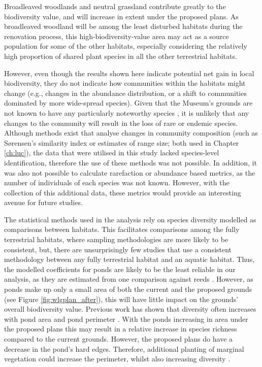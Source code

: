 Broadleaved woodlands and neutral grassland contribute greatly to the biodiversity value, and will increase in extent under the proposed plans. As broadleaved woodland will be among the least disturbed habitats during the renovation process, this high-biodiversity-value area may act as a source population for some of the other habitats, especially considering the relatively high proportion of shared plant species in all the other terrestrial habitats.


However, even though the results shown here indicate potential net gain in local biodiversity, they do not indicate how communities within the habitats might change (e.g., changes in the abundance distribution, or a shift to communities dominated by more wide-spread species). Given that the Museum's grounds are not known to have any particularly noteworthy species \citep{ImpactAssessment:2015cf,PrelimEcoAppraisal:2015cf}, it is unlikely that any changes to the community will result in the loss of rare or endemic species. Although methods exist that analyse changes in community composition (such as S\o rensen's similarity index or estimates of range size; both used in Chapter \ref{ch:luc}), the data that were utilised in this study lacked species-level identification, therefore the use of these methods was not possible. In addition, it was also not possible to calculate rarefaction or abundance based metrics, as the number of individuals of each species was not known. However, with the collection of this additional data, these metrics would provide an interesting avenue for future studies.


The statistical methods used in the analysis rely on species diversity modelled as comparisons between habitats. This facilitates comparisons among the fully terrestrial habitats, where sampling methodologies are more likely to be consistent, but, there are unsurprisingly few studies that use a consistent methodology between any fully terrestrial habitat and an aquatic habitat. Thus, the modelled coefficients for ponds are likely to be the least reliable in our analysis, as they are estimated from one comparison against reeds \citep{Williams:2008hb}. However, as ponds make up only a small area of both the current and the proposed grounds (see Figure \ref{fig:wlgplan_after}), this will have little impact on the grounds' overall biodiversity value. Previous work has shown that diversity often increases with pond area \citep{Oertli:2002bc,Parris:2006jae} and pond perimeter \citep{Gagne:2007le,Gagne:2010ec}. With the ponds increasing in area under the proposed plans this may result in a relative increase in species richness compared to the current grounds. However, the proposed plans do have a decrease in the pond's hard edges. Therefore, additional planting of marginal vegetation could increase the perimeter, whilst also increasing diversity \citep{Williams:2008hb,Gioria:2010bc}.

